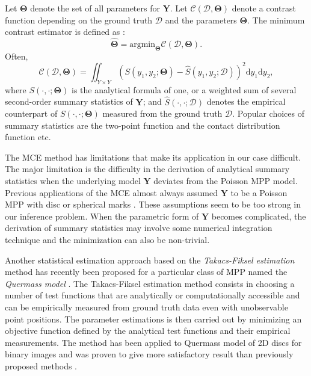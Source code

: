 \documentclass[journal]{IEEEtran}
\newcommand{\dd}[1]{\mathrm{d}#1}%
\begin{document}
Let $\mathbf{\Theta}$ denote the set of all parameters for
$\mathbf{Y}$. Let $\mathcal{C}(\mathcal{D}, \mathbf{\Theta})$ denote a
contrast function depending on the ground truth $\mathcal{D}$ and the
parameters $\mathbf{\Theta}$. The minimum contrast estimator is
defined as \cite{chiu2013stochastic}:
\begin{equation}
  \label{eq:min-const}
  \hat{\mathbf{\Theta}} =
  \text{argmin}_{\mathbf{\Theta}}
  \mathcal{C}(\mathcal{D}, \mathbf{\Theta}).
\end{equation}
Often,
\begin{equation}
  \label{eq:min-often}
  \mathcal{C}(\mathcal{D}, \mathbf{\Theta}) = \iint_{Y \times Y}
  \left( S(y_1, y_2; \mathbf{\Theta}) - \hat{S}(y_1, y_2;
    \mathcal{D}) \right)^2 \dd y_1 \dd y_2,
\end{equation}
where $S(\cdot, \cdot; \mathbf{\Theta})$ is the analytical formula of
one, or a weighted sum of several second-order summary statistics of
$\mathbf{Y}$; and $\hat{S}(\cdot, \cdot; \mathcal{D})$ denotes the
empirical counterpart of $S(\cdot, \cdot; \mathbf{\Theta})$ measured
from the ground truth $\mathcal{D}$. Popular choices of summary
statistics are the two-point function \cite{diggle1981binary} and the
contact distribution function \cite {heinrich1993asymptotic} etc.

The MCE method has limitations that make its application in our case
difficult. The major limitation is the difficulty in the derivation of
analytical summary statistics when the underlying model $\mathbf{Y}$
deviates from the Poisson MPP model. Previous applications of the MCE
almost always assumed $\mathbf{Y}$ to be a Poisson MPP with disc or
spherical marks \cite{diggle1981binary} \cite
{heinrich1993asymptotic}. These assumptions seem to be too strong in
our inference problem. When the parametric form of $\mathbf{Y}$
becomes complicated, the derivation of summary statistics may involve
some numerical integration technique and the minimization can also be
non-trivial.

Another statistical estimation approach based on the
\textit{Takacs-Fiksel estimation} method \cite{dereudre2014estimation}
has recently been proposed for a particular class of MPP named the
\textit{Quermass model} \cite{kendall1997some}. The Takacs-Fiksel
estimation method consists in choosing a number of test functions that
are analytically or computationally accessible and can be empirically
measured from ground truth data even with unobservable point
positions. The parameter estimations is then carried out by minimizing
an objective function defined by the analytical test functions and
their empirical measurements. The method has been applied to Quermass
model of 2D discs for binary images \cite{dereudre2014estimation} and
was proven to give more satisfactory result than previously proposed
methods \cite{moller2010likelihood}.
\end{document}
